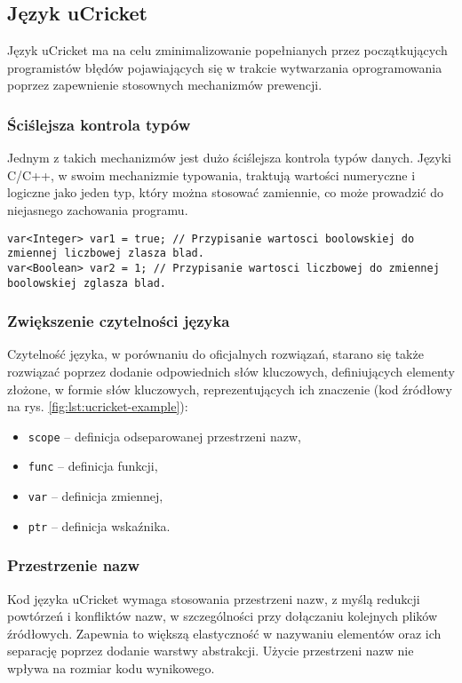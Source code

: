 \subsection{Język uCricket}
Język uCricket ma na celu zminimalizowanie popełnianych przez początkujących programistów błędów pojawiających się w trakcie wytwarzania oprogramowania poprzez zapewnienie stosownych mechanizmów prewencji. 
\subsubsection{Ściślejsza kontrola typów}
Jednym z takich mechanizmów jest dużo ściślejsza kontrola typów danych. Języki C/C++, w swoim  mechanizmie typowania, traktują wartości numeryczne i logiczne jako jeden typ, który można stosować zamiennie, co może prowadzić do niejasnego zachowania programu. 

\begin{lstlisting}
var<Integer> var1 = true; // Przypisanie wartosci boolowskiej do zmiennej liczbowej zlasza blad.
var<Boolean> var2 = 1; // Przypisanie wartosci liczbowej do zmiennej boolowskiej zglasza blad.
\end{lstlisting}
\subsubsection{Zwiększenie czytelności języka}
Czytelność języka, w porównaniu do oficjalnych rozwiązań, starano się także rozwiązać poprzez dodanie odpowiednich słów kluczowych, definiujących elementy złożone, w formie słów kluczowych, reprezentujących ich znaczenie (kod źródłowy na rys. \ref{fig:lst:ucricket-example}):
\begin{itemize}
\item \lstinline|scope| -- definicja odseparowanej przestrzeni nazw,
\item \lstinline|func| -- definicja funkcji,
\item \lstinline|var| -- definicja zmiennej,
\item \lstinline|ptr| -- definicja wskaźnika.
\end{itemize}

\subsubsection{Przestrzenie nazw}
Kod języka uCricket wymaga stosowania przestrzeni nazw, z myślą redukcji powtórzeń i konfliktów nazw, w szczególności przy dołączaniu kolejnych plików źródłowych. Zapewnia to większą elastyczność w nazywaniu elementów oraz ich separację poprzez dodanie warstwy abstrakcji. Użycie przestrzeni nazw nie wpływa na rozmiar kodu wynikowego.

